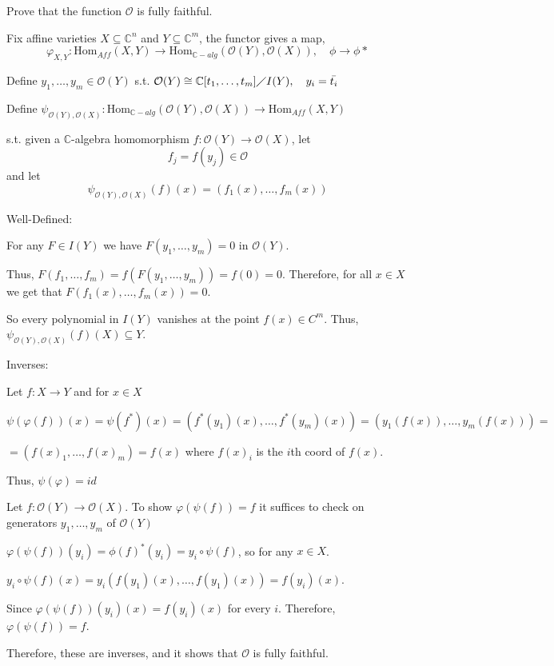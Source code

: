 \documentclass[12pt, letterpaper]{article}
\newcommand{\C}{\mathbb{C}}
\renewcommand{\t}[1]{\text{#1}}
\begin{document}
\qh[]
\addtocounter{subproblemcounter}{1}
\begin{subproblem}{}
    Prove that the function $\mathcal{O}$ is fully faithful.
\end{subproblem}
\begin{problemproof}
    Fix affine varieties $X \subseteq \C^n$ and $Y \subseteq \C^m$, the functor gives a map,
    \[\varphi_{X,Y} : \t{Hom}_{Aff}(X,Y) \to \t{Hom}_{\C-alg}(\mathcal{O}(Y),\mathcal{O}(X)), \quad \phi \to \phi*\]

    Define $y_1,\dots,y_m \in \mathcal{O}(Y)$ s.t. $\mathcal{O}(Y) \cong \C[t_1,\dots,t_m] \diagup I(Y), \quad y_i = \bar{t_i}$

    Define $\psi_{\mathcal{O}(Y),\mathcal{O}(X)}: \t{Hom}_{\C-alg}(\mathcal{O}(Y),\mathcal{O}(X)) \to \t{Hom}_{Aff}(X,Y)$

    s.t. given a $\C$-algebra homomorphism $f : \mathcal{O}(Y) \to \mathcal{O}(X)$, let
    \[f_j = f(y_j) \in \mathcal{O}\]
    and let
    \[\psi_{\mathcal{O}(Y),\mathcal{O}(X)}(f)(x)=(f_1(x),\dots,f_m(x))\]

    Well-Defined:

    For any $F \in I(Y)$ we have $F(y_1,\dots,y_m)=0$ in $\mathcal{O}(Y)$.

    Thus, $F(f_1,\dots,f_m)=f(F(y_1,\dots,y_m))=f(0)=0$. Therefore, for all $x \in X$ we get that $F(f_1(x),\dots,f_m(x))=0$.

    So every polynomial in $I(Y)$ vanishes at the point $f(x) \in C^m$. Thus, $\psi_{\mathcal{O}(Y),\mathcal{O}(X)}(f)(X) \subseteq Y$.

    Inverses:

    Let $f : X \to Y$ and for $x \in X$

    $\psi(\varphi(f))(x)=\psi(f^*)(x)=(f^*(y_1)(x),\dots,f^*(y_m)(x))=(y_1(f(x)),\dots,y_m(f(x)))=$
    
    $=(f(x)_1,\dots,f(x)_m)=f(x)$ where $f(x)_i$ is the $i$th coord of $f(x)$.

    Thus, $\psi(\varphi)=id$

    Let $f : \mathcal{O}(Y) \to \mathcal{O}(X)$. To show $\varphi(\psi(f))=f$ it suffices to check on generators $y_1,\dots,y_m$ of $\mathcal{O}(Y)$

    $\varphi(\psi(f))(y_i)=\phi(f)^*(y_i)=y_i \circ \psi(f)$, so for any $x \in X$.

    $y_i \circ \psi(f)(x)=y_i(f(y_1)(x),\dots,f(y_1)(x))=f(y_i)(x)$.

    Since $\varphi(\psi(f))(y_i)(x)=f(y_i)(x)$ for every $i$. Therefore, $\varphi(\psi(f))=f$.

    Therefore, these are inverses, and it shows that $\mathcal{O}$ is fully faithful.
\end{problemproof}
\end{document}
